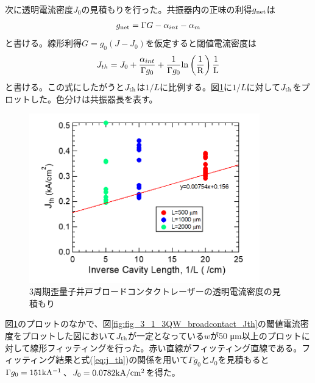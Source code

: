 {{次に透明電流密度$J_{0}$の見積もりを行った。共振器内の正味の利得$g_{\rm{net}}$は
\begin{eqnarray}
g_{\rm{net}}=\Gamma G-\alpha_{int}-\alpha_{m}
\label{eq:eta_j0}
\end{eqnarray}
と書ける。線形利得$G=g_{0}(J-J_{0})$を仮定すると閾値電流密度は
\begin{eqnarray}
J_{th}=J_{0}+\dfrac{\alpha_{int}}{\Gamma g_{0}}+\dfrac{1}{\Gamma g_{0}}\rm{ln}\left(\dfrac{1}{R}\right)\dfrac{1}{L}
\label{eq:j_th}
\end{eqnarray}
と書ける。この式にしたがうと$J_{\rm{th}}$は$1/L$に比例する。図\ref{fig:fig_3_1_3QW_broadcontact_j0}に$1/L$に対して$J_{\rm{th}}$をプロットした。色分けは共振器長を表す。
\begin{figure}[h]
	\centering
	\includegraphics[width=10cm]{figure/fig_3_1_3QW_broadcontact_j0.png}
	\caption{3周期歪量子井戸ブロードコンタクトレーザーの透明電流密度の見積もり}
	\label{fig:fig_3_1_3QW_broadcontact_j0}
\end{figure}

図\ref{fig:fig_3_1_3QW_broadcontact_j0}のプロットのなかで、図\ref{fig:fig_3_1_3QW_broadcontact_Jth}の閾値電流密度をプロットした図において$J_{\rm{th}}$が一定となっている$w$が50 \si{\micro\metre}以上のプロットに対して線形フィッティングを行った。赤い直線がフィッティング直線である。フィッティング結果と式(\ref{eq:j_th})の関係を用いて$\Gamma g_{0}$と$J_{0}$を見積もると$\Gamma g_{0}=151 \rm{ kA^{-1}}$、$J_{0}=0.0782 \rm{kA/cm^{2}}$を得た。


}}
